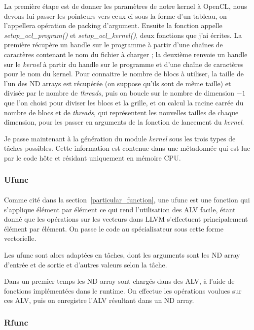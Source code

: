 La première étape est de donner les paramètres de notre kernel à OpenCL, nous
devons lui passer les pointeurs vers ceux-ci sous la forme d’un tableau, on
l'appellera opération de packing d’argument. Ensuite la fonction
appelle \emph{setup\_ocl\_program()} et \emph{setup\_ocl\_kernel()}, deux
fonctions que j’ai écrites. La première récupère un handle sur le programme à
partir d'une chaînes de caractères contenant le nom du fichier à charger ; la
deuxième renvoie un handle sur le \emph{kernel} à partir du handle sur le
programme et d'une chaîne de caractères pour le nom du kernel. Pour connaitre le
nombre de blocs à utiliser, la taille de l’un des ND arrays est récupérée (on
suppose qu’ils sont de même taille) et divisée par le nombre de \emph{threads},
puis on boucle sur le nombre de dimension $-1$ que l'on choisi pour diviser les
blocs et la grille, et on calcul la racine carrée du nombre de blocs et de
\emph{threads}, qui représentent les nouvelles tailles de chaque dimension, pour
les passer en arguments de la fonction de lancement du \emph{kernel}.

Je passe maintenant à la génération du module \emph{kernel} sous les trois types
de tâches possibles.  Cette information est contenue dans une métadonnée qui est
lue par le code hôte et résidant uniquement en mémoire CPU.

\subsubsection{Ufunc}
\paragraph{}
Comme cité dans la section~\ref{particular_function}, une ufunc est une fonction
qui s'applique élément par élément ce qui rend l'utilisation des ALV facile,
étant donné que les opérations sur les vecteurs dans LLVM s'effectuent
principalement élément par élément. On passe le code au spécialisateur sous
cette forme vectorielle.

Les ufunc sont alors adaptées en tâches, dont les arguments sont les ND array
d'entrée et de sortie et d'autres valeurs selon la tâche.

Dans un premier temps les ND array sont chargés dans des ALV, à l'aide de
fonctions implémentées dans le runtime. On effectue les opérations voulues sur
ces ALV, puis on enregistre l’ALV résultant dans un ND array.

\subsubsection{Rfunc}
